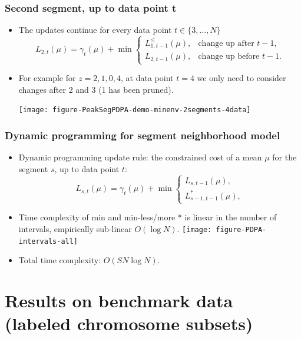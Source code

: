 \documentclass{beamer}
\begin{document}
\begin{frame}
  \frametitle{Second segment, up to data point t}
  \begin{itemize}
  \item The updates continue for every data point $t\in\{3, ..., N\}$
    \begin{equation*}
      L_{2,t}(\mu) =  \gamma_t(\mu) + \min
      \begin{cases}
        L_{1,t-1}^{\leq}(\mu), & \text{change up after $t-1$,}\\
        L_{2,t-1}(\mu), & \text{change up before $t-1$.}
      \end{cases}
    \end{equation*}
  \item For example for $z = 2, 1, 0, 4$, at data point $t=4$
    we only need to consider changes after 2 and 3 (1 has been
    pruned).
    \begin{center}
      \texttt{[image: figure-PeakSegPDPA-demo-minenv-2segments-4data]}
    \end{center}
  \end{itemize}
\end{frame}

\begin{frame}
  \frametitle{Dynamic programming for segment neighborhood model}
  \begin{itemize}
  \item Dynamic programming update rule: the constrained cost of a
    mean $\mu$ for the segment $s$, up to data point $t$:
    \begin{equation*}
      L_{s,t}(\mu) = \gamma_t(\mu) + \min
      \begin{cases}
        L_{s,t-1}(\mu),\\
        L_{s-1,t-1}^{*}(\mu),
      \end{cases}
    \end{equation*}
  \item Time complexity of min and min-less/more * is linear in the
    number of intervals, empirically sub-linear $O(\log N)$.
    \texttt{[image: figure-PDPA-intervals-all]}
  \item Total time complexity: $O(S N\log N)$.
  \end{itemize}
\end{frame}

\section{Results on benchmark data (labeled chromosome subsets)}
\end{document}
